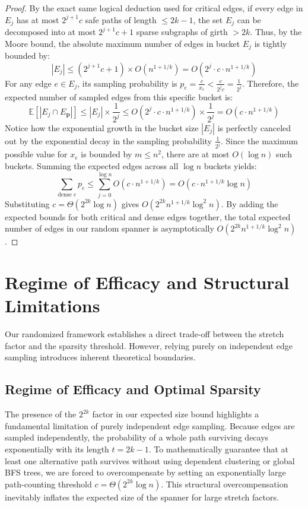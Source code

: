 \documentclass[11pt,a4paper]{article}
\begin{document}
\begin{proof}
By the exact same logical deduction used for critical edges, if every edge in $E_j$ has at most $2^{j+1} c$ safe paths of length $\le 2k-1$, the set $E_j$ can be decomposed into at most $2^{j+1} c + 1$ sparse subgraphs of girth $>2k$. Thus, by the Moore bound, the absolute maximum number of edges in bucket $E_j$ is tightly bounded by:
\[
|E_j| \le (2^{j+1} c + 1) \times O(n^{1+1/k}) = O(2^j \cdot c \cdot n^{1+1/k})
\]
For any edge $e \in E_j$, its sampling probability is $p_e = \frac{c}{x_e} < \frac{c}{2^j c} = \frac{1}{2^j}$.
Therefore, the expected number of sampled edges from this specific bucket is:
\[
\mathbb{E}[|E_j \cap E_{\mathbf{p}}|] \le |E_j| \times \frac{1}{2^j} \le O(2^j \cdot c \cdot n^{1+1/k}) \times \frac{1}{2^j} = O(c \cdot n^{1+1/k})
\]
Notice how the exponential growth in the bucket size $|E_j|$ is perfectly canceled out by the exponential decay in the sampling probability $\frac{1}{2^j}$. Since the maximum possible value for $x_e$ is bounded by $m \le n^2$, there are at most $O(\log n)$ such buckets. Summing the expected edges across all $\log n$ buckets yields:
\[
\sum_{\text{dense } e} p_e \le \sum_{j=0}^{\log n} O(c \cdot n^{1+1/k}) = O(c \cdot n^{1+1/k} \log n)
\]
Substituting $c = \Theta(2^{2k} \log n)$ gives $O(2^{2k} n^{1+1/k} \log^2 n)$. By adding the expected bounds for both critical and dense edges together, the total expected number of edges in our random spanner is asymptotically $O(2^{2k} n^{1+1/k} \log^2 n)$.
\end{proof}

\section{Regime of Efficacy and Structural Limitations}

Our randomized framework establishes a direct trade-off between the stretch factor and the sparsity threshold. However, relying purely on independent edge sampling introduces inherent theoretical boundaries.

\subsection{Regime of Efficacy and Optimal Sparsity}
The presence of the $2^{2k}$ factor in our expected size bound highlights a fundamental limitation of purely independent edge sampling. Because edges are sampled independently, the probability of a whole path surviving decays exponentially with its length $t = 2k-1$. To mathematically guarantee that at least one alternative path survives without using dependent clustering or global BFS trees, we are forced to overcompensate by setting an exponentially large path-counting threshold $c = \Theta(2^{2k} \log n)$. This structural overcompensation inevitably inflates the expected size of the spanner for large stretch factors.
\end{document}
